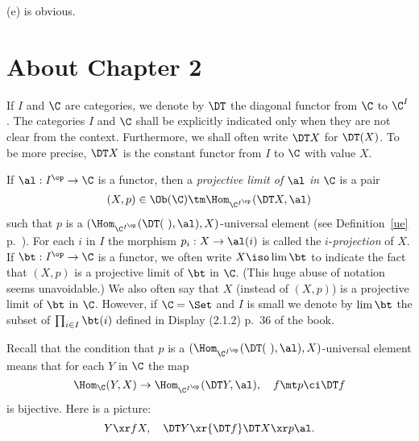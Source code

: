 \documentclass[12pt]{article}
\theoremstyle{remark}
\theoremstyle{definition}
\begin{document}
(e) is obvious.


\section{About Chapter 2}


\begin{nota}
If $I$ and $\C$ are categories, we denote by $\DT$ the diagonal functor from $\C$ to $\C^I$. The categories $I$ and $\C$ shall be explicitly indicated only when they are not clear from the context. Furthermore, we shall often write $\DT X$ for $\DT(X)$. To be more precise, $\DT X$ is the constant functor from $I$ to $\C$ with value $X$.
\end{nota}

\begin{df}
If $\al:I^{\op}\to\C$ is a functor, %
then a {\em projective limit of} $\al$ {\em in} $\C$ is a pair 
$$
(X,p)\in\Ob(\C)\tm\Hom_{\C^{I^{\op}}}(\DT X,\al)
$$
such that $p$ is a $(\Hom_{\C^{I^{\op}}}(\DT(\ ),\al),X)$\--universal element (see Definition~\ref{ue} p.~). For each $i$ in $I$ the morphism $p_i:X\to\al(i)$ is called the $i$-{\em projection} of $X$. %
If $\bt:I^{\op}\to\C$ is a functor, we often write $X\iso\lim\bt$ to indicate the fact that $(X,p)$ is a projective limit of $\bt$ in $\C$. (This huge abuse of notation seems unavoidable.) We also often say that $X$ (instead of $(X,p)$) is a projective limit of $\bt$ in $\C$. However, if $\C=\Set$ and $I$ is small we denote by $\lim\bt$ the subset of $\prod_{i\in I}\bt(i)$ defined in Display (2.1.2) p.~36 of the book.
\end{df}

Recall that the condition that $p$ is a $(\Hom_{\C^{I^{\op}}}(\DT(\ ),\al),X)$\--universal element means that for each $Y$ in $\C$ the map 
$$
\Hom_\C(Y,X)\to\Hom_{\C^{I^{\op}}}(\DT Y,\al),\quad f\mt p\ci\DT f
$$ 
is bijective. Here is a picture:
$$
Y\xr fX,\quad\DT Y\xr{\DT f}\DT X\xr p\al.
$$
\end{document}

